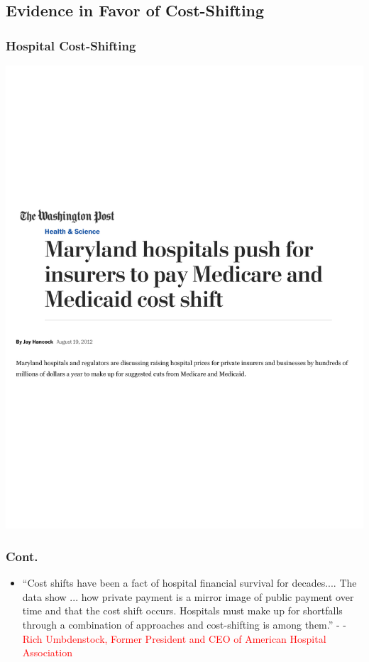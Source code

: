 \documentclass[ucs,9pt]{beamer}
\begin{document}
\subsection{Evidence in Favor of Cost-Shifting}


\begin{frame}
\frametitle{Hospital Cost-Shifting}
\begin{center}
\includegraphics[scale=0.58]{maryland1}
\end{center}
\end{frame}

\begin{frame}
\frametitle{Cont.}
\begin{itemize}
\item ``Cost shifts have been a fact of hospital financial survival for decades.... The data show ...  how private payment is a mirror image of public payment over time and that the cost shift occurs. Hospitals must make up for shortfalls through a combination of approaches and cost-shifting is among them.''
-  -\textcolor{red}{Rich Umbdenstock, Former President and CEO of American Hospital Association}

\end{itemize}
\end{frame}
\end{document}
